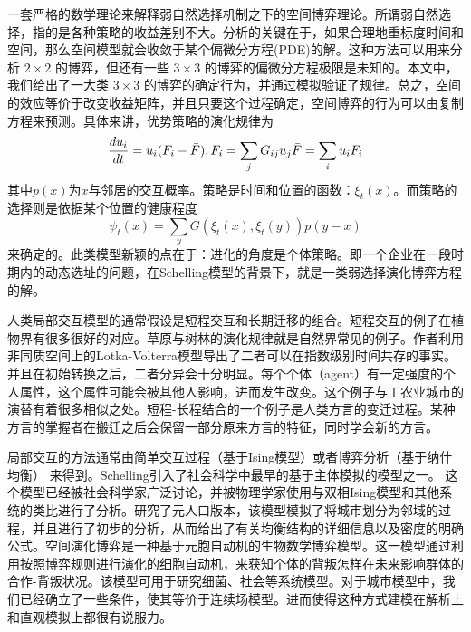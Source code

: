 一套严格的数学理论来解释弱自然选择机制之下的空间博弈理论。所谓弱自然选择，指的是各种策略的收益差别不大。分析的关键在于，如果合理地重标度时间和空间，那么空间模型就会收敛于某个偏微分方程(PDE)的解\cite{nanda2017spatial}。这种方法可以用来分析 $2 \times 2$ 的博弈，但还有一些 $3 \times 3$ 的博弈的偏微分方程极限是未知的。本文中，我们给出了一大类 $3 \times 3$ 的博弈的确定行为，并通过模拟验证了规律。总之，空间的效应等价于改变收益矩阵，并且只要这个过程确定，空间博弈的行为可以由复制方程来预测。具体来讲，优势策略的演化规律为\[\frac{du_i}{dt} = u_i (F_i-\bar{F}),\notag\\
F_i = \sum_j G_{ij}u_{j}\notag\\
\bar{F} = \sum_i u_i F_i\]其中\(p(x)\)为$x$与邻居的交互概率。策略是时间和位置的函数：\(\xi_t(x)\)。而策略的选择则是依据某个位置的健康程度\[\psi_t(x) = \sum_y G(\xi_t(x),\xi_t(y))p(y-x)\]来确定的。此类模型新颖的点在于：进化的角度是个体策略。即一个企业在一段时期内的动态选址的问题，在Schelling模型的背景下，就是一类弱选择演化博弈方程的解。


人类局部交互模型的通常假设是短程交互和长期迁移的组合\cite{rybski2009scaling}。短程交互的例子在植物界有很多很好的对应。草原与树林的演化规律就是自然界常见的例子\cite{durrett2018heterogeneous,durrett2009coexistence}。作者利用非同质空间上的Lotka-Volterra模型导出了二者可以在指数级别时间共存的事实。并且在初始转换之后，二者分异会十分明显。每个个体（agent）有一定强度的个人属性，这个属性可能会被其他人影响，进而发生改变。这个例子与工农业城市的演替有着很多相似之处。短程-长程结合的一个例子是人类方言的变迁过程\cite{PhysRevX.7.031008,seoane2018coexistence,PhysRevE.99.032305}。某种方言的掌握者在搬迁之后会保留一部分原来方言的特征，同时学会新的方言。

局部交互的方法通常由简单交互过程（基于Ising模型）或者博弈分析（基于纳什均衡）\cite{grimalda2016social,Mussa2019Urbanity} 来得到。Schelling引入了社会科学中最早的基于主体模拟的模型之一。 这个模型已经被社会科学家广泛讨论，并被物理学家使用与双相Ising模型和其他系统的类比进行了分析。\cite{Durrett14036}研究了元人口版本，该模型模拟了将城市划分为邻域的过程，并且进行了初步的分析，从而给出了有关均衡结构的详细信息以及密度的明确公式。空间演化博弈\cite{nowak1992evolutionary}是一种基于元胞自动机的生物数学博弈模型。这一模型通过利用按照博弈规则进行演化的细胞自动机，来获知个体的背叛怎样在未来影响群体的合作-背叛状况。该模型可用于研究细菌、社会等系统模型。对于城市模型中，我们已经确立了一些条件\cite{DURRETT1994363}，使其等价于连续场模型。进而使得这种方式建模在解析上和直观模拟上都很有说服力。





